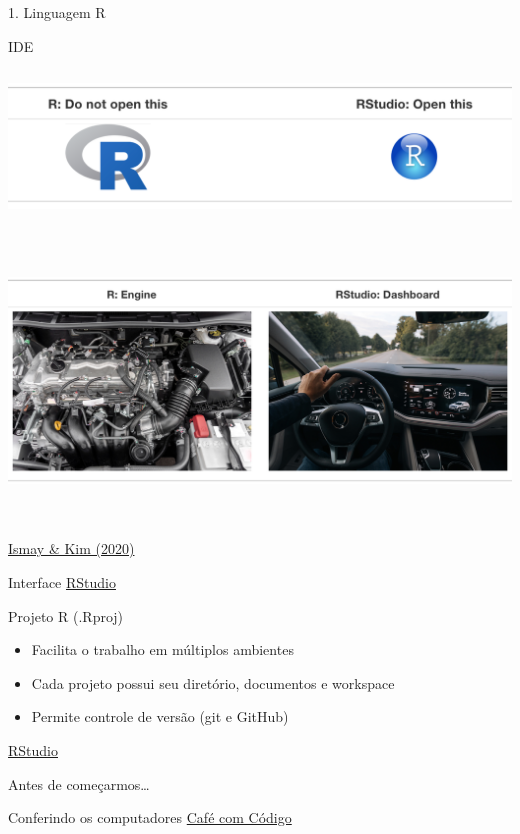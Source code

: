 \documentclass[
  ignorenonframetext,
]{beamer}
\providecommand{\tightlist}{%
  \setlength{\itemsep}{0pt}\setlength{\parskip}{0pt}}\usepackage{longtable,booktabs,array}
\begin{document}
\begin{frame}{1. Linguagem R}
\begin{block}{IDE}
\includegraphics[width=7.29167in,height=1.875in]{img/r_rstudio01.png}
\includegraphics[width=7.29167in,height=2.91667in]{img/r_rstudio02.png}

\href{https://posit.co/downloads/}{Ismay \& Kim (2020)}
\end{block}

\begin{block}{Interface}
\protect\hypertarget{interface}{}
\href{https://www.rstudio.com/}{RStudio}
\end{block}

\begin{block}{Projeto R (.Rproj)}
\protect\hypertarget{projeto-r-.rproj}{}
\begin{itemize}
\tightlist
\item
  Facilita o trabalho em múltiplos ambientes
\item
  Cada projeto possui seu diretório, documentos e workspace
\item
  Permite controle de versão (git e GitHub)
\end{itemize}

\href{https://www.rstudio.com/}{RStudio}
\end{block}
\end{frame}

\begin{frame}{Antes de começarmos\ldots{}}
\protect\hypertarget{antes-de-comeuxe7armos}{}
\begin{block}{Conferindo os computadores}
\protect\hypertarget{conferindo-os-computadores}{}
\href{https://www.instagram.com/cafecomcodigo/?hl=pt}{Café com Código}
\end{block}
\end{frame}
\end{document}
